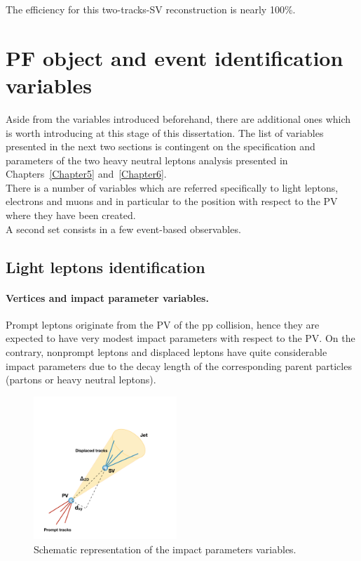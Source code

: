 The efficiency for this two-tracks-SV reconstruction is nearly 100\%.


\section{PF object and event identification
  variables}\label{sec:c2variables}
Aside from the variables introduced beforehand, there are additional
ones which is worth introducing at this stage of this dissertation. 
The list of variables presented in the next two sections is
contingent on the specification and parameters of the two heavy
neutral leptons analysis presented in Chapters~\ref{Chapter5}
and~\ref{Chapter6}.\\
There is a number of variables which are referred specifically to light
leptons, electrons and muons and in particular to the position with
respect to the PV where they have been created. \\
A second set consists in a few event-based observables. 



\subsection*{Light leptons
  identification} \label{sec:c2leptonvariables}

\paragraph{Vertices and impact parameter variables.} \label{sec:c2IP}
Prompt leptons originate from the PV of the pp collision, hence they
are expected to have very modest impact parameters with respect to the
PV. On the contrary, nonprompt leptons and displaced leptons have
quite considerable impact parameters due to the decay length of the
corresponding parent particles (partons or heavy neutral leptons).

\begin{figure}[h]
\centering
  \includegraphics[clip,trim=1cm 0cm 3cm 4cm, width=0.48\textwidth]{Figures/c2/grafico.pdf}
  \caption{Schematic representation of the impact parameters variables.}
  \label{fig:impact}
\end{figure}

